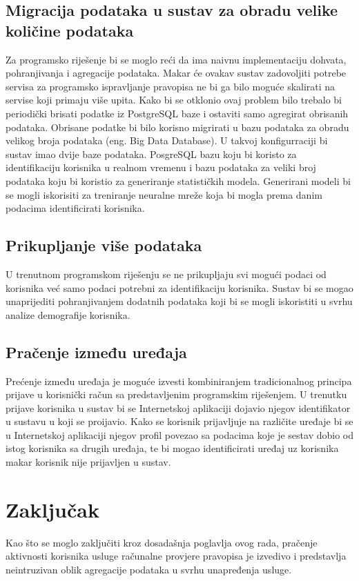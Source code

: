 \documentclass[times, utf8, zavrsni]{fer}
\begin{document}
\section{Migracija podataka u sustav za obradu velike količine podataka}
Za programsko riješenje bi se moglo reći da ima naivnu implementaciju dohvata,
pohranjivanja i agregacije podataka. Makar će ovakav sustav zadovoljiti potrebe
servisa za programsko ispravljanje pravopisa ne bi ga bilo moguće skalirati na
servise koji primaju više upita. Kako bi se otklonio ovaj problem bilo trebalo
bi periodički brisati podatke iz PostgreSQL baze i ostaviti samo agregirat
obrisanih podataka. Obrisane podatke bi bilo korisno migrirati u bazu podataka
za obradu velikog broja podataka (eng. Big Data Database). U takvoj
konfigurraciji bi sustav imao dvije baze podataka. PosgreSQL bazu koju bi
koristo za identifikaciju korisnika u realnom vremenu i bazu podataka za veliki
broj podataka koju bi koristio za generiranje statističkih modela. Generirani
modeli bi se mogli iskorisiti za treniranje neuralne mreže koja bi mogla prema
danim podacima identificirati korisnika.

\section{Prikupljanje više podataka}
U trenutnom programskom riješenju se ne prikupljaju svi mogući podaci od
korisnika već samo podaci potrebni za identifikaciju korisnika. Sustav bi se
mogao unaprijediti pohranjivanjem dodatnih podataka koji bi se mogli iskoristiti
u svrhu analize demografije korisnika.

\section{Pračenje između uređaja}
Prećenje između uređaja je moguće izvesti kombiniranjem tradicionalnog principa
prijave u korisnički račun sa predstavljenim programskim riješenjem. U trenutku
prijave korisnika u sustav bi se Internetskoj aplikaciji dojavio njegov
identifikator u sustavu u koji se proijavio. Kako se korisnik prijavljuje na
različite uređaje bi se u Internetskoj aplikaciji njegov profil povezao sa
podacima koje je sestav dobio od istog korisnika sa drugih uređaja, te bi mogao
identificirati uređaj uz korisnika makar korisnik nije prijavljen u sustav.

\chapter{Zaključak}
Kao što se moglo zaključiti kroz dosadašnja poglavlja ovog rada, pračenje
aktivnosti korisnika usluge računalne provjere pravopisa je izvedivo i
predstavlja neintruzivan oblik agregacije podataka u svrhu unapređenja usluge.
\end{document}
